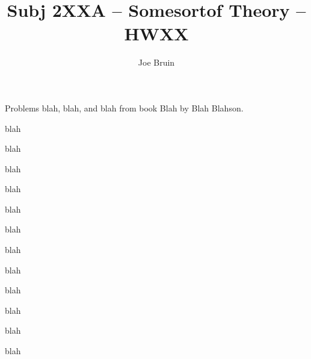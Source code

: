 \documentclass[12pt]{article} %
\title{Subj 2XXA -- Somesortof Theory -- HWXX}
\author{Joe Bruin}
\date{\formatdate{01}{09}{2015}} %
\begin{document}
\maketitle



\begin{em}
Problems blah, blah, and blah from book Blah by Blah Blahson.
\end{em}




\sectionproblem%
\begin{em}
blah
\end{em}


\begin{enumproblem}

\item \begin{em}
blah
\end{em}

blah


\item \begin{em}
blah
\end{em}

blah


\item \begin{em}
blah
\end{em}

blah


\item \begin{em}
blah
\end{em}

blah


\item \begin{em}
blah
\end{em}

blah


\end{enumproblem}




\sectionproblem%
\begin{em}
blah
\end{em}
\end{document}
